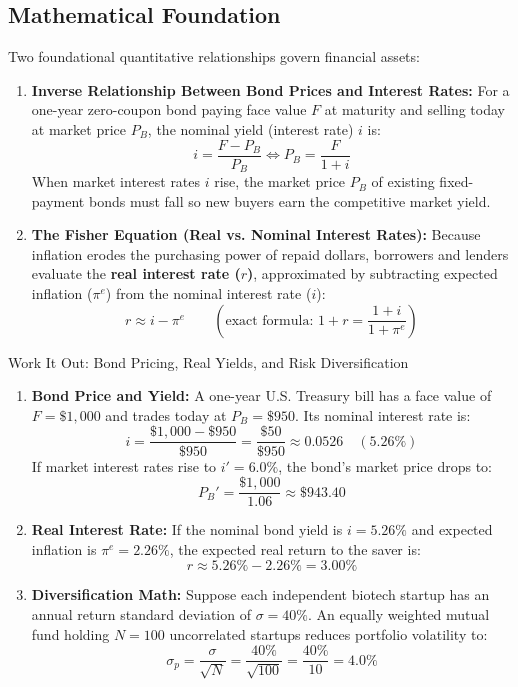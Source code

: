 \documentclass[11pt,letterpaper]{article}
\begin{document}
\subsection*{Mathematical Foundation}
Two foundational quantitative relationships govern financial assets:
\begin{enumerate}
  \item \textbf{Inverse Relationship Between Bond Prices and Interest Rates:} For a one-year zero-coupon bond paying face value $F$ at maturity and selling today at market price $P_B$, the nominal yield (interest rate) $i$ is:
  \begin{equation}
  i = \frac{F - P_B}{P_B} \iff P_B = \frac{F}{1 + i}
  \end{equation}
  When market interest rates $i$ rise, the market price $P_B$ of existing fixed-payment bonds must fall so new buyers earn the competitive market yield.
  \item \textbf{The Fisher Equation (Real vs. Nominal Interest Rates):} Because inflation erodes the purchasing power of repaid dollars, borrowers and lenders evaluate the \textbf{real interest rate ($r$)}, approximated by subtracting expected inflation ($\pi^e$) from the nominal interest rate ($i$):
  \begin{equation}
  r \approx i - \pi^e \qquad \left(\text{exact formula: } 1 + r = \frac{1 + i}{1 + \pi^e}\right)
  \end{equation}
\end{enumerate}

\begin{examplecase}{Work It Out: Bond Pricing, Real Yields, and Risk Diversification}
\begin{enumerate}
  \item \textbf{Bond Price and Yield:} A one-year U.S. Treasury bill has a face value of $F = \$1{,}000$ and trades today at $P_B = \$950$. Its nominal interest rate is:
  $$i = \frac{\$1{,}000 - \$950}{\$950} = \frac{\$50}{\$950} \approx 0.0526 \quad (5.26\%)$$
  If market interest rates rise to $i' = 6.0\%$, the bond's market price drops to:
  $$P_B' = \frac{\$1{,}000}{1.06} \approx \$943.40$$
  \item \textbf{Real Interest Rate:} If the nominal bond yield is $i = 5.26\%$ and expected inflation is $\pi^e = 2.26\%$, the expected real return to the saver is:
  $$r \approx 5.26\% - 2.26\% = 3.00\%$$
  \item \textbf{Diversification Math:} Suppose each independent biotech startup has an annual return standard deviation of $\sigma = 40\%$. An equally weighted mutual fund holding $N = 100$ uncorrelated startups reduces portfolio volatility to:
  $$\sigma_p = \frac{\sigma}{\sqrt{N}} = \frac{40\%}{\sqrt{100}} = \frac{40\%}{10} = 4.0\%$$
\end{enumerate}
\end{examplecase}
\end{document}
